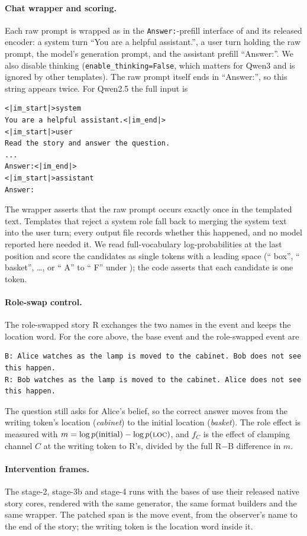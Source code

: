 \paragraph{Chat wrapper and scoring.} Each raw prompt is wrapped as in the \texttt{Answer:}-prefill interface of \citet{anonymous2026fitted} and its released encoder: a system turn ``You are a helpful assistant.'', a user turn holding the raw prompt, the model's generation prompt, and the assistant prefill ``Answer:''. We also disable thinking (\texttt{enable\_thinking=False}, which matters for Qwen3 and is ignored by other templates). The raw prompt itself ends in ``Answer:'', so this string appears twice. For Qwen2.5 the full input is
{\small
\begin{verbatim}
<|im_start|>system
You are a helpful assistant.<|im_end|>
<|im_start|>user
Read the story and answer the question.
...
Answer:<|im_end|>
<|im_start|>assistant
Answer:
\end{verbatim}
}
The wrapper asserts that the raw prompt occurs exactly once in the templated text. Templates that reject a system role fall back to merging the system text into the user turn; every output file records whether this happened, and no model reported here needed it. We read full-vocabulary log-probabilities at the last position and score the candidates as single tokens with a leading space (`` box'', `` basket'', \ldots, or `` A'' to `` F'' under \fmtLetter{}); the code asserts that each candidate is one token.

\paragraph{Role-swap control.} The role-swapped story R exchanges the two names in the event and keeps the location word. For the core above, the base event and the role-swapped event are
{\small
\begin{verbatim}
B: Alice watches as the lamp is moved to the cabinet. Bob does not see this happen.
R: Bob watches as the lamp is moved to the cabinet. Alice does not see this happen.
\end{verbatim}
}
The question still asks for Alice's belief, so the correct answer moves from the writing token's location (\emph{cabinet}) to the initial location (\emph{basket}). The role effect is measured with $m = \log p(\text{initial}) - \log p(\textsc{loc})$, and $f_C$ is the effect of clamping channel $C$ at the writing token to R's, divided by the full R$-$B difference in $m$.

\paragraph{Intervention frames.} The stage-2, stage-3b and stage-4 runs with the bases of \citet{anonymous2026fitted} use their released native story cores, rendered with the same generator, the same format builders and the same wrapper. The patched span is the move event, from the observer's name to the end of the story; the writing token is the location word inside it.


